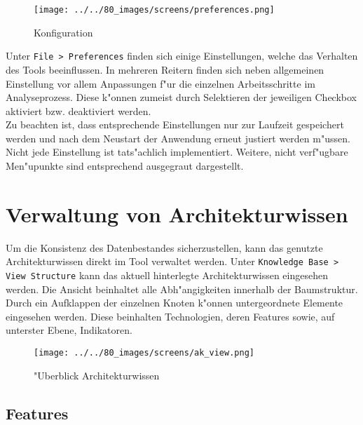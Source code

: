 \documentclass{proc}
\begin{document}
	\begin{figure}[h!]
		\centering
		\caption{Konfiguration}
		\texttt{[image: ../../80\_images/screens/preferences.png]}
	\end{figure}
	
	Unter \texttt{File > Preferences} finden sich einige Einstellungen, welche das Verhalten des Tools beeinflussen.
	In mehreren Reitern finden sich neben allgemeinen Einstellung vor allem Anpassungen f"ur die einzelnen Arbeitsschritte im Analyseprozess.
	Diese k"onnen zumeist durch Selektieren der jeweiligen Checkbox aktiviert bzw. deaktiviert werden.
	\\
	Zu beachten ist, dass entsprechende Einstellungen nur zur Laufzeit gespeichert werden und nach dem Neustart der Anwendung erneut justiert werden m"ussen.
	Nicht jede Einstellung ist tats"achlich implementiert.
	Weitere, nicht verf"ugbare Men"upunkte sind entsprechend ausgegraut dargestellt.
	
	\section{Verwaltung von Architekturwissen}
	
	Um die Konsistenz des Datenbestandes sicherzustellen, kann das genutzte Architekturwissen direkt im Tool verwaltet werden.
	Unter \texttt{Knowledge Base > View Structure} kann das aktuell hinterlegte Architekturwissen eingesehen werden.
	Die Ansicht beinhaltet alle Abh"angigkeiten innerhalb der Baumstruktur.
	Durch ein Aufklappen der einzelnen Knoten k"onnen untergeordnete Elemente eingesehen werden.
	Diese beinhalten Technologien, deren Features sowie, auf unterster Ebene, Indikatoren.
	
	\begin{figure}[h!]
		\centering
		\caption{"Uberblick Architekturwissen}
		\texttt{[image: ../../80\_images/screens/ak\_view.png]}
	\end{figure}
	
	\subsection{Features}
	
\end{document}
